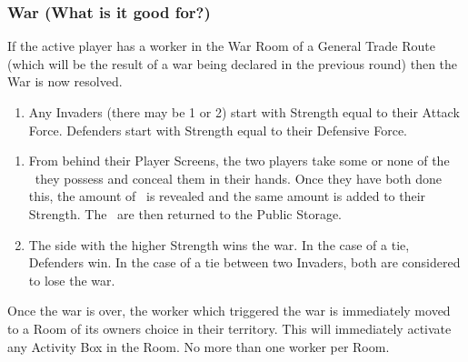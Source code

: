 \documentclass[10pt,twocolumn]{article}
\begin{document}
\subsubsection{War (What is it good for?)}
If the active player has a worker in the War Room of a General Trade Route (which will be the result of a war being declared in the previous round) then the War is now resolved.
\begin{enumerate}
\item Any Invaders (there may be 1 or 2) start with Strength equal to their Attack Force. Defenders start with Strength equal to their Defensive Force.
\end{enumerate}
\begin{enumerate}[resume]
\item From behind their Player Screens, the two players take some or none of the \minerals\ they possess and conceal them in their hands. Once they have both done this, the amount of \minerals\ is revealed and the same amount is added to their Strength. The \minerals\ are then returned to the Public Storage.
\item The side with the higher Strength wins the war. In the case of a tie, Defenders win. In the case of a tie between two Invaders, both are considered to lose the war.
\iftoggle{original-rules}{
\item The winning player (if any) receives \victorypoints: \eraCost{5}{10}{15} \vps\ for a winning Invader; \eraCost{3}{6}{9} \vps\ for a winning Defender. These \victorypoints\ are taken from the Public Storage.
\item In addition, if the difference in Strengths was 5 or more, the winner receives 7 \vps\ from the loser for a ``perfect victory''. This bonus can apply to Invaders or Defenders. It is important to note that these \vps\ are taken from the losing player, not the Public Storage.
}{
\item The winning player (if any) receives \victorypoints: \eraCost{5}{10}{15} \vps\ for a winning Invader; \eraCost{3}{6}{9} \vps\ for a winning Defender. This \victorypoint\ is taken from the Public Storage.
\item In addition, if the difference in Strengths was 5 or more, the winner receives 7 \vps\ from the loser for a ``perfect victory''. This bonus can apply to Invaders or Defenders. It is important to note that this \vps\ is taken from the losing player, not the Public Storage.
}
\end{enumerate}
Once the war is over, the worker which triggered the war is immediately moved to a Room of its owners choice in their territory. This will immediately activate any Activity Box in the Room. No more than one worker per Room.
\end{document}
